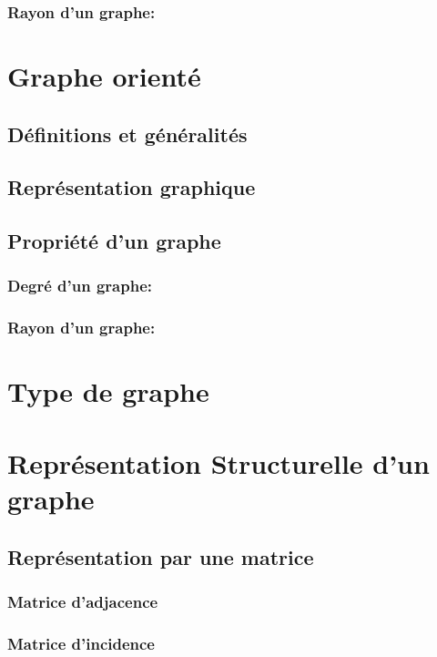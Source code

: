 \documentclass[11pt,a4paper]{report}
\begin{document}
			\subsubsection{Rayon d'un graphe:}
			
	
	
	\section{Graphe orienté}
		\subsection{Définitions et généralités}
		\subsection{Représentation graphique}
		\subsection{Propriété d'un graphe} %
			\subsubsection{Degré d'un graphe:}
			\subsubsection{Rayon d'un graphe:}
	
	\section{Type de graphe} %
	
	\section{Représentation Structurelle d'un graphe}
		\subsection{Représentation par une matrice}
			\subsubsection{Matrice d'adjacence}
			\subsubsection{Matrice d'incidence}
\end{document}
